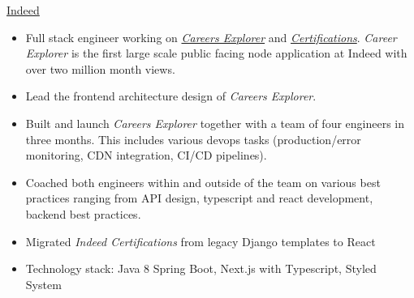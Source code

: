 \documentclass[]{cv} %
\begin{document}
\entry
{\href{https://www.indeed.com/}{Indeed}}
{
\begin{itemize}
\item Full stack engineer working on \href{https://www.indeed.com/career}{\emph{Careers Explorer}} and \href{https://www.indeed.com/certifications/}{\emph{Certifications}}. \emph{Career Explorer} is the first large scale public facing node application at Indeed with over two million month views.
\item Lead the frontend architecture design of \emph{Careers Explorer}.
\item Built and launch \emph{Careers Explorer} together with a team of four engineers in three months. This includes various devops tasks (production/error monitoring, CDN integration, CI/CD pipelines).
\item Coached both engineers within and outside of the team on various best practices ranging from API design, typescript and react development, backend best practices.
\item Migrated \emph{Indeed Certifications} from legacy Django templates to React
\item Technology stack: Java 8 Spring Boot, Next.js with Typescript, Styled System
\end{itemize}
}
\end{document}
